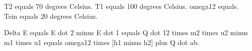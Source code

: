 T2 equals 70 degrees Celsius.
T1 equals 100 degrees Celsius.
omega12 equals.
Tein equals 20 degrees Celsius.

Delta E equals E dot 2 minus E dot 1 equals Q dot 12 times m2 times u2 minus m1 times u1 equals omega12 times [h1 minus h2] plus Q dot ab.
